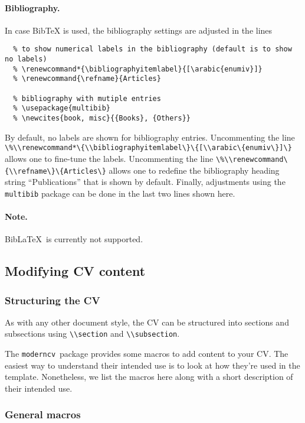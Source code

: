 \documentclass[a4paper, 11pt]{article}
\newcommand{\note}{\paragraph{Note.}}
\newcommand{\code}[1]{\lstinline!#1!}
\newcommand{\moderncv}{\code{moderncv}}
\newcommand{\Moderncv}{\moderncv~}
\newcommand{\biblatex}{BibLaTeX}
\newcommand{\Biblatex}{\biblatex~}
\begin{document}
\paragraph{Bibliography.}
In case BibTeX is used, the bibliography settings are adjusted in the lines
\begin{lstlisting}
  % to show numerical labels in the bibliography (default is to show no labels)
  % \renewcommand*{\bibliographyitemlabel}{[\arabic{enumiv}]}
  % \renewcommand{\refname}{Articles}

  % bibliography with mutiple entries
  % \usepackage{multibib}
  % \newcites{book, misc}{{Books}, {Others}}
\end{lstlisting}
By default, no labels are shown for bibliography entries.
Uncommenting the line \code{\%\\renewcommand*\{\\bibliographyitemlabel\}\{[\\arabic\{enumiv\}]\}}
allows one to fine-tune the labels.
Uncommenting the line \code{\%\\renewcommand\{\\refname\}\{Articles\}} allows one to redefine the bibliography heading string ``Publications'' that is shown by default.
Finally, adjustments using the \code{multibib} package can be done in the last two lines shown here.

\note \Biblatex is currently not supported.

\subsection{Modifying CV content}
\subsubsection{Structuring the CV}
As with any other document style, the CV can be structured into sections and subsections using \code{\\section} and \code{\\subsection}.

The \Moderncv package provides some macros to add content to your CV.
The easiest way to understand their intended use is to look at how they're used in the template.
Nonetheless, we list the macros here along with a short description of their intended use.

\subsubsection{General macros}
\end{document}

